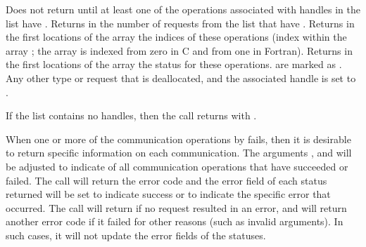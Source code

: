 Does not return until
at least one of the operations associated with 
handles in the list have .
Returns in  the number of requests from the list
 that have .  Returns in the first
 locations of the array 
the indices of these operations (index within the
array ; the array is indexed from zero in
C and from one in
Fortran).  Returns in the first 
locations of the array 
the status for these  operations.
   are marked as .  Any other
type or request that 
is deallocated, and the
associated handle is set to .

If the list contains no  handles, then the
call returns  with \mpicode{ = }.

When one or more of the communication operations  by
 fails, then it is desirable to return specific
information on each communication.
The arguments ,
 and  will be
adjusted to indicate  of all communication operations that have
succeeded or failed.  The call will return the error code
 and the error field of each status
returned will be set to indicate success or to indicate the specific error
that occurred.  The call will return  if no request
resulted in an error,
and will return another error code if it failed
for other reasons (such as invalid arguments).  In such cases, it will
not update the error fields of the statuses.

